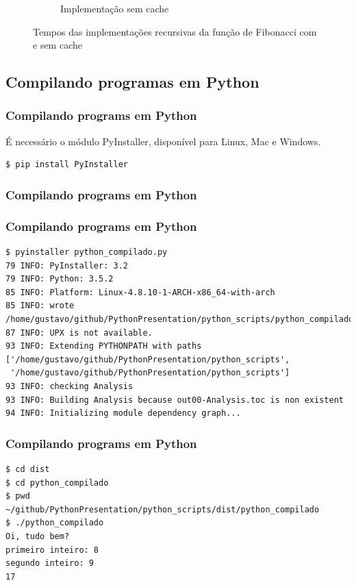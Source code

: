 \documentclass[aspectratio=169]{beamer}
\begin{document}
\begin{frame}
\begin{figure}
\begin{subfigure}{.5\textwidth}
		  \caption{Implementação sem cache}
		  \label{fig:sub2}
		\end{subfigure}
		\caption{Tempos das implementações recursivas da função de Fibonacci com e sem cache}
		\label{fig:test}
	\end{figure}
\end{frame}

\subsection{Compilando programas em Python}

\begin{frame}[fragile]
	\frametitle{Compilando programs em Python}
	É necessário o módulo PyInstaller, disponível para Linux, Mac e Windows.

	\begin{lstlisting}
$ pip install PyInstaller
	\end{lstlisting}
\end{frame}

\begin{frame}[fragile]
	\frametitle{Compilando programs em Python}
	
\end{frame}

\begin{frame}[fragile]
	\frametitle{Compilando programs em Python}

	\begin{lstlisting}
$ pyinstaller python_compilado.py
79 INFO: PyInstaller: 3.2
79 INFO: Python: 3.5.2
85 INFO: Platform: Linux-4.8.10-1-ARCH-x86_64-with-arch
85 INFO: wrote /home/gustavo/github/PythonPresentation/python_scripts/python_compilado.spec
87 INFO: UPX is not available.
93 INFO: Extending PYTHONPATH with paths
['/home/gustavo/github/PythonPresentation/python_scripts',
 '/home/gustavo/github/PythonPresentation/python_scripts']
93 INFO: checking Analysis
93 INFO: Building Analysis because out00-Analysis.toc is non existent
94 INFO: Initializing module dependency graph...
	\end{lstlisting}
\end{frame}

\begin{frame}[fragile]
	\frametitle{Compilando programs em Python}

	\begin{lstlisting}
$ cd dist
$ cd python_compilado
$ pwd
~/github/PythonPresentation/python_scripts/dist/python_compilado
$ ./python_compilado
Oi, tudo bem?
primeiro inteiro: 8
segundo inteiro: 9
17
	\end{lstlisting}
\end{frame}
\end{document}
